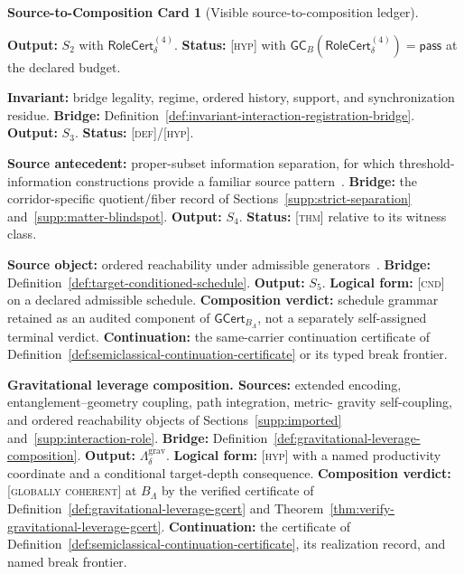 \documentclass[11pt]{article}
\newcommand{\GCpass}{\textsc{[globally coherent]}}
\newcommand{\GCcert}{\ensuremath{\mathsf{GCert}}}
\newcommand{\Defn}{\textsc{[def]}}
\newcommand{\Thm}{\textsc{[thm]}}
\newcommand{\Cnd}{\textsc{[cnd]}}
\newcommand{\Hyp}{\textsc{[hyp]}}
\theoremstyle{definition}
\newtheorem{compositioncard}{Source-to-Composition Card}
\begin{document}
\begin{compositioncard}[Visible source-to-composition ledger]
\begin{description}
\textbf{Output:} $S_2$ with $\mathsf{RoleCert}^{(4)}_\delta$.
\textbf{Status:} \Hyp{} with
$\mathsf{GC}_B(\mathsf{RoleCert}^{(4)}_\delta)=\mathsf{pass}$ at the declared budget.
\item[$\mathsf{SC}_3$---typed transfer.] \textbf{Invariant:} bridge legality,
regime, ordered history, support, and synchronization residue.
\textbf{Bridge:} Definition~\ref{def:invariant-interaction-registration-bridge}.
\textbf{Output:} $S_3$. \textbf{Status:} \Defn{}/\Hyp{}.
\item[$\mathsf{SC}_4$---blind-spot criterion.] \textbf{Source antecedent:}
proper-subset information separation, for which threshold-information constructions
provide a familiar source pattern~\cite{S_Shamir1979}. \textbf{Bridge:} the
corridor-specific quotient/fiber record of Sections~\ref{supp:strict-separation}
and~\ref{supp:matter-blindspot}. \textbf{Output:} $S_4$. \textbf{Status:} \Thm{}
relative to its witness class.
\item[$\mathsf{SC}_5$---target-conditioned schedule.] \textbf{Source object:}
ordered reachability under admissible generators~\cite{S_JurdjevicSussmann1972}.
\textbf{Bridge:} Definition~\ref{def:target-conditioned-schedule}. \textbf{Output:}
$S_5$. \textbf{Logical form:} \Cnd{} on a declared admissible schedule.
\textbf{Composition verdict:} schedule grammar retained as an audited component of
$\GCcert_{B_\Lambda}$, not a separately self-assigned terminal verdict.
\textbf{Continuation:} the same-carrier continuation certificate of
Definition~\ref{def:semiclassical-continuation-certificate} or its typed break
frontier.
\item[$\mathsf{SC}_{\Lambda}$.] \textbf{Gravitational leverage composition. Sources:}
extended encoding, entanglement--geometry coupling, path integration, metric-
gravity self-coupling, and ordered reachability objects of
Sections~\ref{supp:imported} and~\ref{supp:interaction-role}.
\textbf{Bridge:} Definition~\ref{def:gravitational-leverage-composition}.
\textbf{Output:} $\Lambda^{\mathrm{grav}}_\delta$.
\textbf{Logical form:} \Hyp{} with a named productivity coordinate and a
conditional target-depth consequence. \textbf{Composition verdict:}
\GCpass{} at $B_\Lambda$ by the verified certificate of
Definition~\ref{def:gravitational-leverage-gcert} and
Theorem~\ref{thm:verify-gravitational-leverage-gcert}.
\textbf{Continuation:} the certificate of
Definition~\ref{def:semiclassical-continuation-certificate}, its realization
record, and named break frontier.
\item[$\mathsf{SC}_{\mathrm{gain}}$---selected physical gain witnesses.]

\end{description}
\end{compositioncard}
\end{document}
